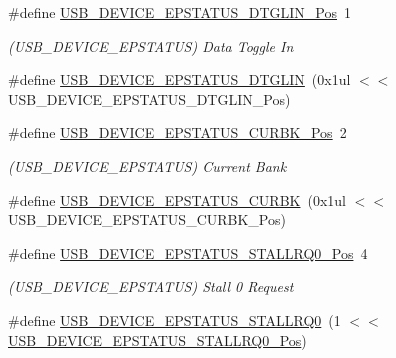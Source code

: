 \begin{DoxyCompactItemize}
\item 
\#define \mbox{\hyperlink{group___s_a_m_d21___u_s_b_ga2edb8490965d90125035ffb95395ca1d}{U\+S\+B\+\_\+\+D\+E\+V\+I\+C\+E\+\_\+\+E\+P\+S\+T\+A\+T\+U\+S\+\_\+\+D\+T\+G\+L\+I\+N\+\_\+\+Pos}}~1
\begin{DoxyCompactList}\small\item\em (U\+S\+B\+\_\+\+D\+E\+V\+I\+C\+E\+\_\+\+E\+P\+S\+T\+A\+T\+US) Data Toggle In \end{DoxyCompactList}\item 
\#define \mbox{\hyperlink{group___s_a_m_d21___u_s_b_gacb109d50174104fe8b043a4376de8d31}{U\+S\+B\+\_\+\+D\+E\+V\+I\+C\+E\+\_\+\+E\+P\+S\+T\+A\+T\+U\+S\+\_\+\+D\+T\+G\+L\+IN}}~(0x1ul $<$$<$ U\+S\+B\+\_\+\+D\+E\+V\+I\+C\+E\+\_\+\+E\+P\+S\+T\+A\+T\+U\+S\+\_\+\+D\+T\+G\+L\+I\+N\+\_\+\+Pos)
\item 
\#define \mbox{\hyperlink{group___s_a_m_d21___u_s_b_gabdd7b3bcfbcec69d09e2291cf07b27f5}{U\+S\+B\+\_\+\+D\+E\+V\+I\+C\+E\+\_\+\+E\+P\+S\+T\+A\+T\+U\+S\+\_\+\+C\+U\+R\+B\+K\+\_\+\+Pos}}~2
\begin{DoxyCompactList}\small\item\em (U\+S\+B\+\_\+\+D\+E\+V\+I\+C\+E\+\_\+\+E\+P\+S\+T\+A\+T\+US) Current Bank \end{DoxyCompactList}\item 
\#define \mbox{\hyperlink{group___s_a_m_d21___u_s_b_gaa25e492984b843de4bd68912d0c2fc1c}{U\+S\+B\+\_\+\+D\+E\+V\+I\+C\+E\+\_\+\+E\+P\+S\+T\+A\+T\+U\+S\+\_\+\+C\+U\+R\+BK}}~(0x1ul $<$$<$ U\+S\+B\+\_\+\+D\+E\+V\+I\+C\+E\+\_\+\+E\+P\+S\+T\+A\+T\+U\+S\+\_\+\+C\+U\+R\+B\+K\+\_\+\+Pos)
\item 
\#define \mbox{\hyperlink{group___s_a_m_d21___u_s_b_gaaef5c9dbdf17a2e001dcdf5b4eb9d49c}{U\+S\+B\+\_\+\+D\+E\+V\+I\+C\+E\+\_\+\+E\+P\+S\+T\+A\+T\+U\+S\+\_\+\+S\+T\+A\+L\+L\+R\+Q0\+\_\+\+Pos}}~4
\begin{DoxyCompactList}\small\item\em (U\+S\+B\+\_\+\+D\+E\+V\+I\+C\+E\+\_\+\+E\+P\+S\+T\+A\+T\+US) Stall 0 Request \end{DoxyCompactList}\item 
\#define \mbox{\hyperlink{group___s_a_m_d21___u_s_b_gabfdc15c79e2beeaebd2e9fd02189e252}{U\+S\+B\+\_\+\+D\+E\+V\+I\+C\+E\+\_\+\+E\+P\+S\+T\+A\+T\+U\+S\+\_\+\+S\+T\+A\+L\+L\+R\+Q0}}~(1 $<$$<$ \mbox{\hyperlink{group___s_a_m_d21___u_s_b_gaaef5c9dbdf17a2e001dcdf5b4eb9d49c}{U\+S\+B\+\_\+\+D\+E\+V\+I\+C\+E\+\_\+\+E\+P\+S\+T\+A\+T\+U\+S\+\_\+\+S\+T\+A\+L\+L\+R\+Q0\+\_\+\+Pos}})
\item 
$$
\end{DoxyCompactItemize}
